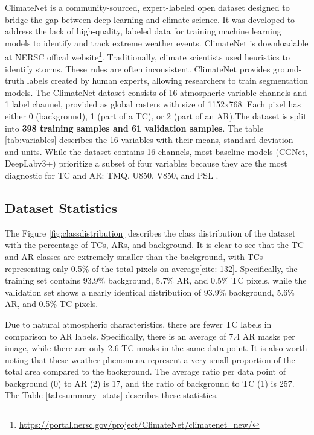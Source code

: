 ClimateNet is a community-sourced, expert-labeled open dataset designed to bridge the gap between deep learning and climate science. It was developed to address the lack of high-quality, labeled data for training machine learning models to identify and track extreme weather events. ClimateNet is downloadable at NERSC offical website\footnote{\url{https://portal.nersc.gov/project/ClimateNet/climatenet_new/}}. Traditionally, climate scientists used heuristics to identify storms. These rules are often inconsistent. ClimateNet provides ground-truth labels created by human experts, allowing researchers to train segmentation models. The ClimateNet dataset consists of 16 atmospheric variable channels and 1 label channel, provided as global rasters with size of 1152x768. Each pixel has either 0 (background), 1 (part of a TC), or 2 (part of an AR).The dataset is split into \textbf{398 training samples  and 61 validation samples}. The table \ref{tab:variables} describes the 16 variables with their means, standard deviation and units. While the dataset contains 16 channels, most baseline models (CGNet, DeepLabv3+)  prioritize a subset of four variables because they are the most diagnostic for TC and AR: TMQ, U850, V850, and PSL \cite{prabhat2020climatenet, biard2019automated,radke2024explaining}.


\subsection{Dataset Statistics} \label{dataset_stats}


The Figure \ref{fig:classdistribution} describes the class distribution of the dataset with the percentage of TCs, ARs, and background. It is clear to see that the TC and AR classes are extremely smaller than the background, with TCs representing only 0.5\% of the total pixels on average[cite: 132]. Specifically, the training set contains 93.9\% background, 5.7\% AR, and 0.5\% TC pixels, while the validation set shows a nearly identical distribution of 93.9\% background, 5.6\% AR, and 0.5\% TC pixels. 

Due to natural atmospheric characteristics, there are fewer TC labels in comparison to AR labels. Specifically, there is an average of 7.4 AR masks per image, while there are only 2.6 TC masks in the same data point. It is also worth noting that these weather phenomena represent a very small proportion of the total area compared to the background. The average ratio per data point of background (0) to AR (2) is 17, and the ratio of background to TC (1) is 257. The Table \ref{tab:summary_stats} describes these statistics.

